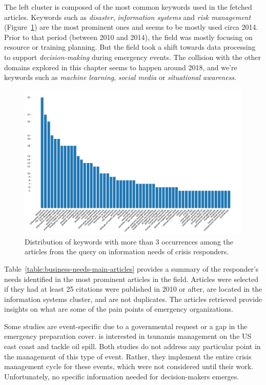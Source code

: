 The left cluster is composed of the most common keywords used in the fetched articles.
Keywords such as \emph{disaster}, \emph{information systems} and \emph{risk management} (Figure~\ref{literature:business-needs-bar}) are the most prominent ones and seems to be mostly used circa 2014.
Prior to that period (between 2010 and 2014), the field was mostly focusing on resource or training planning.
But the field took a shift towards data processing to support \emph{decision-making} during emergency events.
The collision with the other domains explored in this chapter seems to happen around 2018, and we're keywords such as \emph{machine learning}, \emph{social media} or \emph{situational awareness}.

\begin{figure}[htb]
    \centering
    \includegraphics[width=\textwidth]{figures/chap-2/business-needs-bar.pdf}
    \caption{Distribution of keywords with more than 3 occurrences among the articles from the query on information needs of crisis responders.}
    \label{literature:business-needs-bar}
\end{figure}

Table~\ref{table:business-needs-main-articles} provides a summary of the responder's needs identified in the most prominent articles in the field.
Articles were selected if they had at least 25 citations were published in 2010 or after, are located in the information systems cluster, and are not duplicates.
The articles retrieved provide insights on what are some of the pain points of emergency organizations.

Some studies are event-specific due to a governmental request or a gap in the emergency preparation cover.
\textcite{lindellTsunamiPreparednessOregon2010} is interested in tsunamis management on the US east coast and \textcite{cabreraaguileraModellingPerformanceVariabilities2016} tackle oil spill.
Both studies do not address any particular point in the management of this type of event.
Rather, they implement the entire crisis management cycle for these events, which were not considered until their work.
Unfortunately, no specific information needed for decision-makers emerges.

